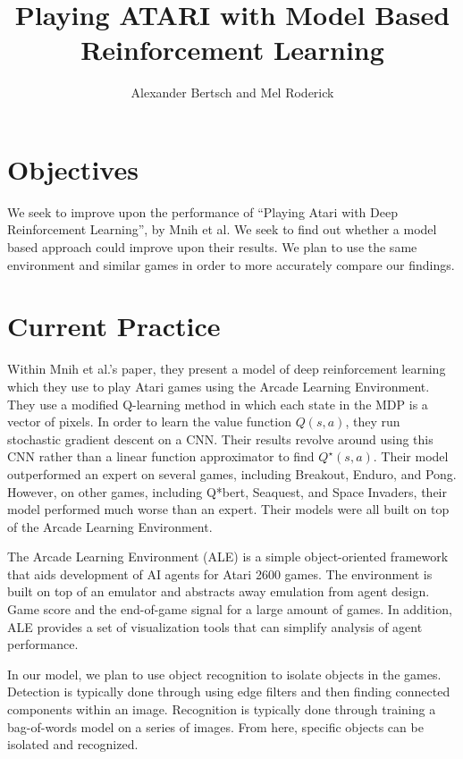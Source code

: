 \documentclass[11pt]{article}
\begin{document}
\title{Playing ATARI with Model Based Reinforcement Learning}
\author{Alexander Bertsch and Mel Roderick}
\maketitle

\section{Objectives}
\label{S:objectives}

We seek to improve upon the performance of ``Playing Atari with Deep Reinforcement Learning'', by Mnih et al. We seek to find out whether a model based approach could improve upon their results. We plan to use the same environment and similar games in order to more accurately compare our findings.

\section{Current Practice}
\label{S:practice}

Within Mnih et al.'s paper, they present a model of deep reinforcement learning which they use to play Atari games using the Arcade Learning Environment. They use a modified Q-learning method in which each state in the MDP is a vector of pixels. In order to learn the value function \(Q(s, a)\), they run stochastic gradient descent on a CNN. Their results revolve around using this CNN rather than a linear function approximator to find \(Q^{\star}(s, a)\). Their model outperformed an expert on several games, including Breakout, Enduro, and Pong. However, on other games, including Q*bert, Seaquest, and Space Invaders, their model performed much worse than an expert. Their models were all built on top of the Arcade Learning Environment.

The Arcade Learning Environment (ALE) is a simple object-oriented framework that aids development of AI agents for Atari 2600 games. The environment is built on top of an emulator and abstracts away emulation from agent design. Game score and the end-of-game signal for a large amount of games. In addition, ALE provides a set of visualization tools that can simplify analysis of agent performance.

In our model, we plan to use object recognition to isolate objects in the games. Detection is typically done through using edge filters and then finding connected components within an image. Recognition is typically done through training a bag-of-words model on a series of images. From here, specific objects can be isolated and recognized.
\end{document}
